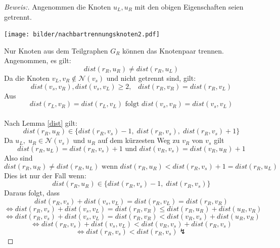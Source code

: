 \par
\begin{proof}[Beweis:] Angenommen die Knoten $u_L,u_R$ mit den obigen Eigenschaften seien getrennt.
\begin{floatingfigure}[r]{200pt}
\centering
\texttt{[image: bilder/nachbartrennungsknoten2.pdf]}
\end{floatingfigure}
Nur Knoten aus dem Teilgraphen $G_R$ können das Knotenpaar trennen. Angenommen, es gilt: $$dist(r_R,u_R)\neq dist(r_R,u_L)$$
\newline
Da die Knoten $v_L, v_R \notin \mathcal{N}(v_s)$ und nicht getrennt sind, gilt: $$dist(v_s,v_R),dist(v_s,v_L)\geq 2,\;\;\; dist(r_R,v_R)=dist(r_R,v_L)$$ 
Aus $$dist(r_L,v_R)=dist(r_L,v_L) \text{ folgt }dist(v_s,v_R)=dist(v_s,v_L)$$\\
Nach Lemma \ref{dist} gilt: $$dist(r_R,u_R)\in \{dist(r_R,v_s)-1,\; dist(r_R,v_s),\;dist(r_R,v_s)+1\}$$
Da $u_L,\;u_R \in \mathcal{N}(v_s)$ und $u_R$ auf dem kürzesten Weg zu $v_R$ von $v_s$ gilt $$dist(r_R,u_L)=dist(r_R,v_s)+1\text{ und }dist(v_R,v_s)=dist(v_R,u_R)+1$$
Also sind $$dist(r_R,u_R)\neq dist(r_R,u_L)\text{ wenn }dist(r_R,u_R)<dist(r_R,v_s)+1=dist(r_R,u_L)$$
Dies ist nur der Fall wenn: $$dist(r_R,u_R)\in \{dist(r_R,v_s)-1,\; dist(r_R,v_s)\}$$
Daraus folgt, dass $$dist(r_R,v_s)+dist(v_s,v_L)=dist(r_R,v_L)=dist(r_R,v_R)$$
$$\Leftrightarrow  dist(r_R,v_s)+dist(v_s,v_L)=dist(r_R,v_R) \leq dist(r_R,u_R)+dist(u_R,v_R)$$
$$\Leftrightarrow  dist(r_R,v_s)+dist(v_s,v_L)=dist(r_R,v_R)< dist(v_R,v_s)+dist(u_R,v_R)$$
$$\Leftrightarrow  dist(r_R,v_s)+dist(v_s,v_L)< dist(v_R,v_s)+dist(r_R,v_s)$$
$$\Leftrightarrow  dist(r_R,v_s)<dist(r_R,v_s)\lightning$$
\end{proof}
\par
